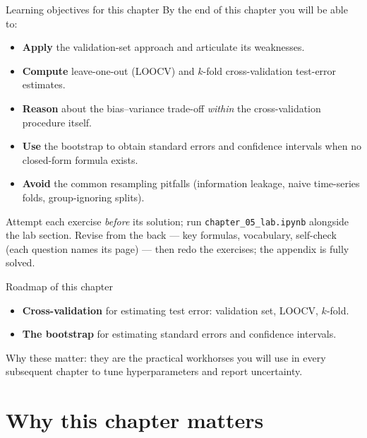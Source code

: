 \documentclass[aspectratio=169,11pt]{beamer}
\begin{document}
\begin{frame}{Learning objectives for this chapter}
  \small
  By the end of this chapter you will be able to:
  \begin{itemize}
    \item \textbf{Apply} the validation-set approach and articulate
          its weaknesses.
    \item \textbf{Compute} leave-one-out (LOOCV) and $k$-fold
          cross-validation test-error estimates.
    \item \textbf{Reason} about the bias--variance trade-off
          \emph{within} the cross-validation procedure itself.
    \item \textbf{Use} the bootstrap to obtain standard errors and
          confidence intervals when no closed-form formula exists.
    \item \textbf{Avoid} the common resampling pitfalls (information
          leakage, naive time-series folds, group-ignoring splits).
  \end{itemize}
  \begin{readme}
    \footnotesize Attempt each exercise \emph{before} its solution; run
    \texttt{chapter\_05\_lab.ipynb} alongside the lab section. Revise from the
    back --- key formulas, vocabulary, self-check (each question names its
    page) --- then redo the exercises; the appendix is fully solved.
  \end{readme}
\end{frame}


\begin{frame}{Roadmap of this chapter}
  \begin{takeaway}
    \begin{itemize}
      \item \textbf{Cross-validation} for estimating test error:
            validation set, LOOCV, $k$-fold.
      \item \textbf{The bootstrap} for estimating standard errors and
            confidence intervals.
    \end{itemize}
  \end{takeaway}
  Why these matter: they are the practical workhorses you will use in
  every subsequent chapter to tune hyperparameters and report
  uncertainty.
\end{frame}

\section{Why this chapter matters}
\end{document}
